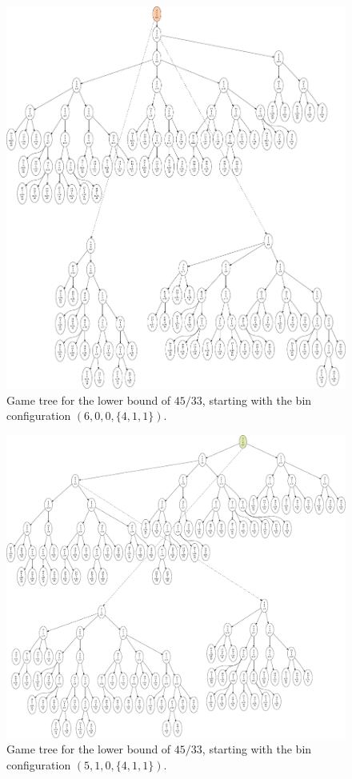\newpage
\begin{figure}
\includegraphics[scale=0.6]{img/6-0-0.pdf}
\caption{Game tree for the lower bound of $45/33$, starting with the bin configuration $(6,0,0,\{4,1,1\})$.}
\end{figure}

\begin{figure}
\includegraphics[scale=0.6]{img/5-1-0.pdf}
\caption{Game tree for the lower bound of $45/33$, starting with the bin configuration $(5,1,0,\{4,1,1\})$.}
\end{figure}

